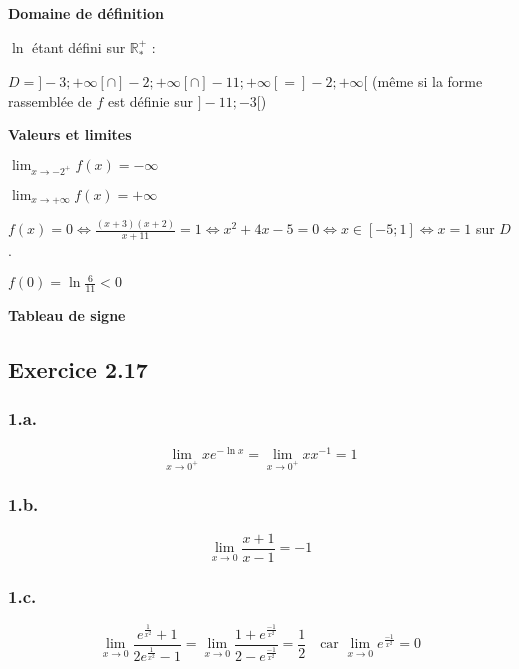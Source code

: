 \documentclass[a4paper,10pt]{report}
\begin{document}
\textbf{Domaine de définition}

$\ln$ étant défini sur $\mathbb{R}^{+}_{*}$ :

$D = ]-3 ; +\infty[ \cap ]-2 ; +\infty[ \cap ]-11 ; +\infty[ = ]-2 ; +\infty[$ (même si la forme rassemblée de $f$ est définie sur $]-11 ; -3[$)

\textbf{Valeurs et limites}

$\lim_{x \rightarrow -2^+} f(x) = -\infty$

$\lim_{x \rightarrow +\infty} f(x) = +\infty$

$f(x)=0 \Longleftrightarrow  \frac{(x+3)(x+2)}{x+11} = 1 \Longleftrightarrow x^2 +4x -5 =0 \Longleftrightarrow x \in [-5 ; 1] \Longleftrightarrow x=1$ sur $D$.

$f(0) = \ln\frac{6}{11} < 0$

\textbf{Tableau de signe}



\subsection*{Exercice 2.17}

\subsubsection*{1.a.}
\begin{displaymath}
	\lim_{x \rightarrow 0^{+}} x e^{-\ln x} = \lim_{x \rightarrow 0^{+}} x x^{-1} = 1
\end{displaymath}

\subsubsection*{1.b.}
\begin{displaymath}
	\lim_{x \rightarrow 0} \frac{x+1}{x-1} = -1
\end{displaymath}

\subsubsection*{1.c.}
\begin{displaymath}
		\lim_{x \rightarrow 0} \frac{e^{\frac{1}{x^2}}+1}{2e^{\frac{1}{x^2}}-1}
		        = \lim_{x \rightarrow 0} \frac{1 + e^{\frac{-1}{x^2}}}{2-e^{\frac{-1}{x^2}}} = \frac{1}{2}
		        \quad \text{car } \lim_{x \rightarrow 0} e^{\frac{-1}{x^2}} = 0
\end{displaymath}
\end{document}
